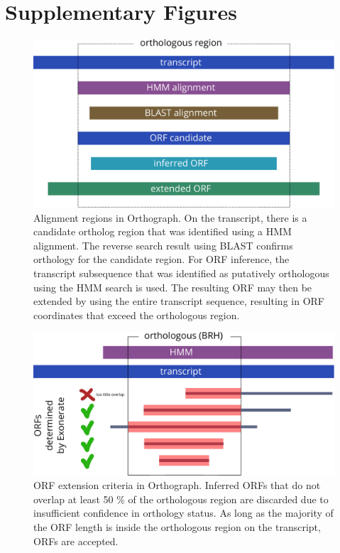 \section{Supplementary Figures}

\begin{figure}[htbp]
\centering
\includegraphics[width=\textwidth]{figures/alignment-regions.pdf}
\caption[Alignment regions in Orthograph]{Alignment regions in
Orthograph. On the transcript, there is a candidate ortholog region that
was identified using a HMM alignment. The reverse search result using
BLAST confirms orthology for the candidate region. For ORF inference,
the transcript subsequence that was identified as putatively orthologous
using the HMM search is used. The resulting ORF may then be extended by
using the entire transcript sequence, resulting in ORF coordinates that
exceed the orthologous region.}
\label{fig:alignment-regions}
\end{figure}

\newpage

\begin{figure}[htbp]
\centering
\includegraphics[width=\textwidth]{figures/orf-overlap-minimum.pdf}
\caption[ORF extension criteria in Orthograph]{ORF extension criteria in
Orthograph. Inferred ORFs that do not overlap at least 50 \% of the
orthologous region are discarded due to insufficient confidence in
orthology status. As long as the majority of the ORF length is inside
the orthologous region on the transcript, ORFs are accepted.}
\label{fig:orf-overlap}
\end{figure}

